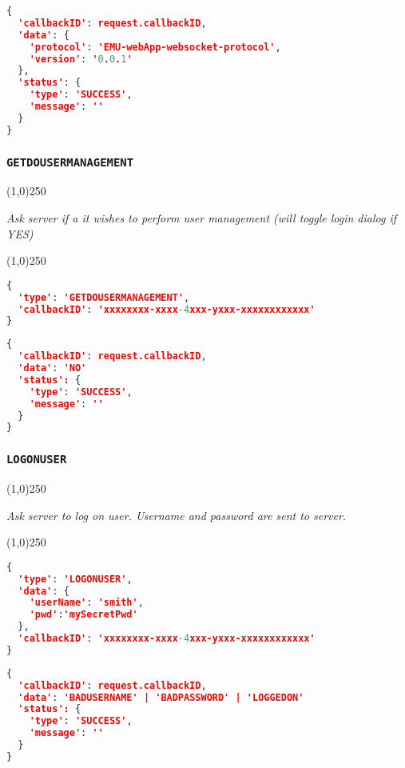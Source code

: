 \documentclass[A4,12pt, utf8]{article}
\begin{document}
\begin{lstlisting}[caption=response content, language=json]
{
  'callbackID': request.callbackID,
  'data': {
    'protocol': 'EMU-webApp-websocket-protocol',
    'version': '0.0.1'
  },
  'status': {
    'type': 'SUCCESS',
    'message': ''
  }
}
\end{lstlisting}

\subsubsection{\texttt{GETDOUSERMANAGEMENT}}
\begin{center}
  \line(1,0){250}

  \textit{Ask server if a it wishes to perform user management (will toggle login dialog if YES)}

  \line(1,0){250}
\end{center}


\begin{lstlisting}[caption=Request content, language=json]
{
  'type': 'GETDOUSERMANAGEMENT', 
  'callbackID': 'xxxxxxxx-xxxx-4xxx-yxxx-xxxxxxxxxxxx'
}
\end{lstlisting}

\begin{lstlisting}[caption=response content, language=json]
{
  'callbackID': request.callbackID,
  'data': 'NO'
  'status': {
    'type': 'SUCCESS',
    'message': ''
  }
}
\end{lstlisting}

\subsubsection{\texttt{LOGONUSER}}
\begin{center}
  \line(1,0){250}

  \textit{Ask server to log on user. Username and password are sent to server.}

  \line(1,0){250}
\end{center}

\begin{lstlisting}[caption=Request content, language=json]
{
  'type': 'LOGONUSER',
  'data': {
    'userName': 'smith', 
    'pwd':'mySecretPwd'
  },
  'callbackID': 'xxxxxxxx-xxxx-4xxx-yxxx-xxxxxxxxxxxx'
}
\end{lstlisting}

\begin{lstlisting}[caption=response content, language=json]
{
  'callbackID': request.callbackID,
  'data': 'BADUSERNAME' | 'BADPASSWORD' | 'LOGGEDON'
  'status': {
    'type': 'SUCCESS',
    'message': ''
  }
}
\end{lstlisting}
\end{document}
